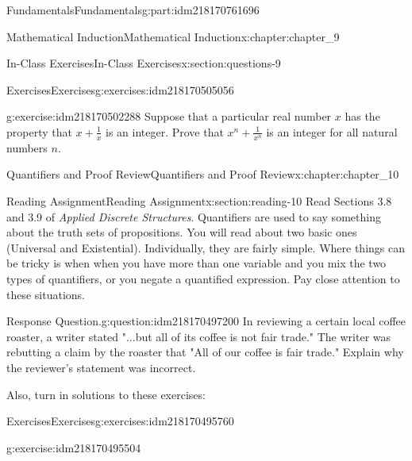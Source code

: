 \documentclass[oneside,10pt,]{book}
\numberwithin{equation}{section}
\begin{document}
\begin{partptx}{Fundamentals}{}{Fundamentals}{}{}{g:part:idm218170761696}
\begin{chapterptx}{Mathematical Induction}{}{Mathematical Induction}{}{}{x:chapter:chapter_9}
\begin{sectionptx}{In-Class Exercises}{}{In-Class Exercises}{}{}{x:section:questions-9}
\begin{exercises-subsection-numberless}{Exercises}{}{Exercises}{}{}{g:exercises:idm218170505056}
\begin{exercisegroup}
\begin{divisionexerciseeg}{3}{}{}{g:exercise:idm218170502288}
Suppose that a particular real number \(x\) has the property that \(x + \frac{1}{x}\) is an integer.  Prove that \(x^n + \frac{1}{x^n}\) is an integer for all natural numbers \(n\).%
\end{divisionexerciseeg}%
\end{exercisegroup}
\par\medskip\noindent
\end{exercises-subsection-numberless}
\end{sectionptx}
\end{chapterptx}
%
\typeout{************************************************}
\typeout{************************************************}
%
\begin{chapterptx}{Quantifiers and Proof Review}{}{Quantifiers and Proof Review}{}{}{x:chapter:chapter_10}
\index{}%
%
%
\typeout{************************************************}
\typeout{************************************************}
%
\begin{sectionptx}{Reading Assignment}{}{Reading Assignment}{}{}{x:section:reading-10}
Read Sections 3.8 and 3.9 of \emph{Applied Discrete Structures}.  Quantifiers are used to say something about the truth sets of propositions.  You will read about two basic ones (Universal and Existential).  Individually, they are fairly simple.  Where things can be tricky is when when you have more than one variable and you mix the two types of quantifiers, or you negate a quantified expression.  Pay close attention to these situations.%
\begin{question}{Response Question.}{g:question:idm218170497200}%
In reviewing a certain local coffee roaster, a writer stated  "...but all of its coffee is not fair trade." The writer was rebutting a claim by the roaster that "All of our coffee is fair trade."  Explain why the reviewer's statement was incorrect.%
\end{question}
Also, turn in solutions to these exercises:%
%
%
\typeout{************************************************}
\typeout{************************************************}
%
\begin{exercises-subsection-numberless}{Exercises}{}{Exercises}{}{}{g:exercises:idm218170495760}
\par\medskip\noindent%
%
\begin{exercisegroup}
\begin{divisionexerciseeg}{1}{}{}{g:exercise:idm218170495504}%

\end{divisionexerciseeg}
\end{exercisegroup}
\end{exercises-subsection-numberless}
\end{sectionptx}
\end{chapterptx}
\end{partptx}
\end{document}
